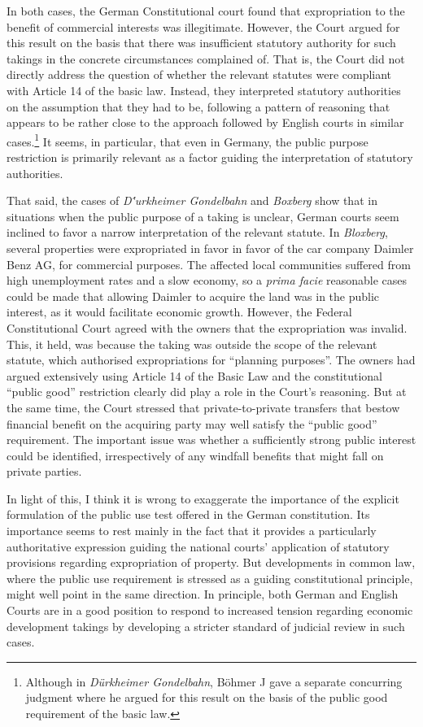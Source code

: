 In both cases, the German Constitutional court found that expropriation to the benefit of commercial interests was illegitimate. However, the Court argued for this result on the basis that there was insufficient statutory authority for such takings in the concrete circumstances complained of. That is, the Court did not directly address the question of whether the relevant statutes were compliant with Article 14 of the basic law. Instead, they interpreted statutory authorities on the assumption that they had to be, following a pattern of reasoning that appears to be rather close to the approach followed by English courts in similar cases.\footnote{Although in {\it Dürkheimer Gondelbahn}, Böhmer J gave a separate concurring judgment where he argued for this result on the basis of the public good requirement of the basic law.} It seems, in particular, that even in Germany, the public purpose restriction is primarily relevant as a factor guiding the interpretation of statutory authorities.

That said, the cases of {\it D{\''u}rkheimer Gondelbahn} and {\it Boxberg} show that in situations when the public purpose of a taking is unclear, German courts seem inclined to favor a narrow interpretation of the relevant statute. In {\it Bloxberg}, several properties were expropriated in favor in favor of the car company Daimler Benz AG, for commercial purposes. The affected local communities suffered from high unemployment rates and a slow economy, so a {\it prima facie} reasonable cases could be made that allowing Daimler to acquire the land was in the public interest, as it would facilitate economic growth. However, the Federal Constitutional Court agreed with the owners that the expropriation was invalid. This, it held, was because the taking was outside the scope of the relevant statute, which authorised expropriations for ``planning purposes''. The owners had argued extensively using Article 14 of the Basic Law and the constitutional ``public good'' restriction clearly did play a role in the Court's reasoning. But at the same time, the Court stressed that private-to-private transfers that bestow financial benefit on the acquiring party may well satisfy the ``public good'' requirement. The important issue was whether a sufficiently strong public interest could be identified, irrespectively of any windfall benefits that might fall on private parties.

In light of this, I think it is wrong to exaggerate the importance of the explicit formulation of the public use test offered in the German constitution. Its importance seems to rest mainly in the fact that it provides a particularly authoritative expression guiding the national courts' application of statutory provisions regarding expropriation of property. But developments in common law, where the public use requirement is stressed as a guiding constitutional principle, might well point in the same direction. In principle, both German and English Courts are in a good position to respond to increased tension regarding economic development takings by developing a stricter standard of judicial review in such cases.

